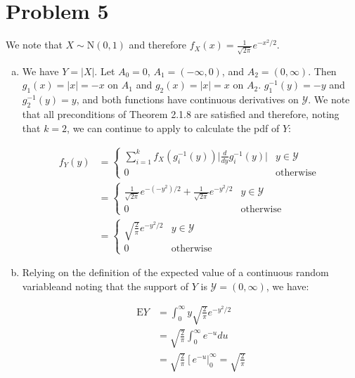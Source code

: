 \documentclass[11pt]{article}
\begin{document}
\section*{Problem 5}

We note that $X \sim \mathrm{N}(0,1)$ and therefore $f_X(x) = \frac{1}{\sqrt{2 \pi}} e^{-x^2/2}$.

\begin{enumerate}[(a)]
  \item We have $Y = |X|$.  Let $A_0 = {0}$, $A_1 = (-\infty, 0)$, and $A_2 = (0, \infty)$.  Then $g_1(x) = |x| = -x$ on $A_1$ and $g_2(x) = |x| = x$ on $A_2$.  $g_1^{-1}(y) = -y$ and $g_2^{-1}(y) = y$, and both functions have continuous derivatives on $\mathcal{Y}$.  We note that all preconditions of Theorem 2.1.8 are satisfied and therefore, noting that $k=2$, we can continue to apply to calculate the pdf of $Y$:

    \begin{align*}
      f_Y(y) &=
      \begin{cases}
        \sum_{i=1}^k f_X(g_i^{-1}(y)) \bigg| \frac{d}{dy} g_i^{-1}(y) \bigg| & y \in \mathcal{Y} \\
        0 & \text{otherwise }
      \end{cases} \\
      &=
      \begin{cases}
        \frac{1}{\sqrt{2 \pi}} e^{-(-y^2)/2} + \frac{1}{\sqrt{2 \pi}} e^{-y^2/2} & y \in \mathcal{Y} \\
        0 & \text{otherwise}
      \end{cases} \\
      &=
      \begin{cases}
        \sqrt{\frac{2}{\pi}} e^{-y^2/2} & y \in \mathcal{Y} \\
        0 & \text{otherwise}
      \end{cases}
    \end{align*}

  \item Relying on the definition of the expected value of a continuous random variableand noting that the support of $Y$ is $\mathcal{Y} = (0, \infty)$, we have:

    \begin{align*}
      \mathrm{E} Y &= \int_{0}^{\infty} y \sqrt{\frac{2}{\pi}} e^{-y^2/2} \\
      &= \sqrt{\frac{2}{\pi}} \int_0^{\infty} e^{-u} du \\
      &= \sqrt{\frac{2}{\pi}} \left[ e^{-u} \right|_0^{\infty} = \sqrt{\frac{2}{\pi}}
    \end{align*}


\end{enumerate}
\end{document}
